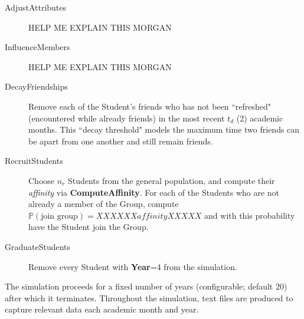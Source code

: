 \begin{description}
\item[AdjustAttributes] HELP ME EXPLAIN THIS MORGAN

\item[InfluenceMembers] HELP ME EXPLAIN THIS MORGAN

\item[DecayFriendships] Remove each of the Student's friends who has not been
``refreshed" (encountered while already friends) in the most recent $t_d$ (2)
academic months. This ``decay threshold" models the maximum time two friends
can be apart from one another and still remain friends.

\item[RecruitStudents] Choose $n_r$ Students from the general population, and
compute their \textit{affinity} via \textbf{ComputeAffinity}. For each of the
Students who are not already a member of the Group, compute 
$\mathbb{P}(\text{join group})=XXXXXX  \textit{affinity} XXXXX$
and with this probability have the Student join the Group.

\item[GraduateStudents] Remove every Student with \textbf{Year}=4 from the
simulation.

\end{description}

The simulation proceeds for a fixed number of years (configurable; default 20)
after which it terminates. Throughout the simulation, text files are produced
to capture relevant data each academic month and year.

% 
% 
% 
% 
% 
